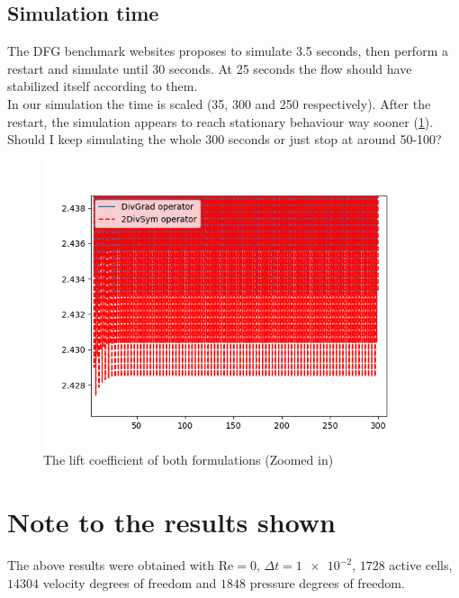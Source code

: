 \documentclass[]{scrartcl}
\begin{document}
\subsection{Simulation time}
The DFG benchmark websites proposes to simulate 3.5 seconds, then perform a restart and simulate until 30 seconds. At 25 seconds the flow should have stabilized itself according to them. \\
In our simulation the time is scaled (35, 300 and 250 respectively). After the restart, the simulation appears to reach stationary behaviour way sooner (\cref{Fig:SimulationTime}). Should I keep simulating the whole 300 seconds or just stop at around 50-100?
\begin{figure}
	\centering
	\includegraphics[width=0.5\linewidth]{SimulationTime.png}
	\caption{The lift coefficient of both formulations (Zoomed in)}
	\label{Fig:SimulationTime}
\end{figure}
\section{Note to the results shown}
The above results were obtained with $\textrm{Re} = 0$, $\Delta t = \num{1e-2}$, $1728$ active cells, $14304$ velocity degrees of freedom and $1848$ pressure degrees of freedom.
\end{document}
